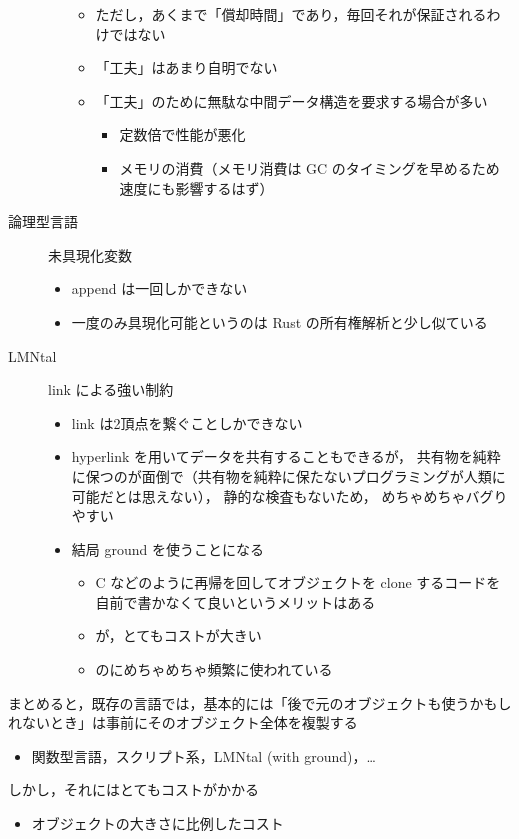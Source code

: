 \documentclass[10pt, a4j, twocolumn]{scrartcl}
\begin{document}
\begin{description}
\begin{itemize}
\begin{itemize}
\item ただし，あくまで「償却時間」であり，毎回それが保証されるわけではない
\item 「工夫」はあまり自明でない
\item 「工夫」のために無駄な中間データ構造を要求する場合が多い
\begin{itemize}
\item 定数倍で性能が悪化
\item メモリの消費（メモリ消費は GC のタイミングを早めるため速度にも影響するはず）
\end{itemize}
\end{itemize}
\end{itemize}
\item[{論理型言語}] 未具現化変数
\begin{itemize}
\item append は一回しかできない
\item 一度のみ具現化可能というのは Rust の所有権解析と少し似ている
\end{itemize}
\item[{LMNtal}] link による強い制約
\begin{itemize}
\item link は2頂点を繋ぐことしかできない
\item hyperlink を用いてデータを共有することもできるが，
共有物を純粋に保つのが面倒で（共有物を純粋に保たないプログラミングが人類に可能だとは思えない），
静的な検査もないため，
めちゃめちゃバグりやすい
\item 結局 ground を使うことになる
\begin{itemize}
\item C などのように再帰を回してオブジェクトを clone するコードを自前で書かなくて良いというメリットはある
\item が，とてもコストが大きい
\item のにめちゃめちゃ頻繁に使われている
\end{itemize}
\end{itemize}
\end{description}



まとめると，既存の言語では，基本的には「後で元のオブジェクトも使うかもしれないとき」は事前にそのオブジェクト全体を複製する
\begin{itemize}
\item 関数型言語，スクリプト系，LMNtal (with ground)，\ldots{}
\end{itemize}


しかし，それにはとてもコストがかかる
\begin{itemize}
\item オブジェクトの大きさに比例したコスト
\end{itemize}
\end{document}
